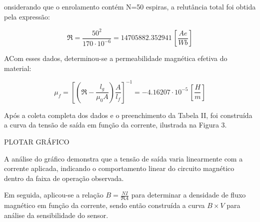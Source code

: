 \documentclass[10pt,twocolumn,letterpaper]{article}
\begin{document}
\hspace{1cm} onsiderando que o enrolamento contém N=50 espiras, a relutância total foi obtida pela expressão:

\begin{equation*}
    \mathfrak{R} = \frac{50^2}{170\cdot10^{-6}} = 14705882.352941 \, \left[\frac{Ae}{Wb}\right]
\end{equation*}

\hspace{1cm} ACom esses dados, determinou-se a permeabilidade magnética efetiva do material:

\begin{equation*}
    \mu_f = \left[ \left( \mathfrak{R} - \frac{l_g}{\mu_0A} \right) \frac{A}{l_f} \right]^{-1} = -4.16207 \cdot 10^{-5} \, \left[\frac{H}{m}\right]
\end{equation*}

\hspace{1cm} Após a coleta completa dos dados e o preenchimento da Tabela II, foi construída a curva da tensão de saída em função da corrente, ilustrada na Figura 3.

{\Huge PLOTAR GRÁFICO}

\hspace{1cm} A análise do gráfico demonstra que a tensão de saída varia linearmente com a corrente aplicada, indicando o comportamento linear do circuito magnético dentro da faixa de operação observada.

\hspace{1cm} Em seguida, aplicou-se a relação $B = \frac{NI}{\mathfrak{R}A} $ para determinar a densidade de fluxo magnético em função da corrente, sendo então construída a curva $B \times V$ para análise da sensibilidade do sensor.
\end{document}

